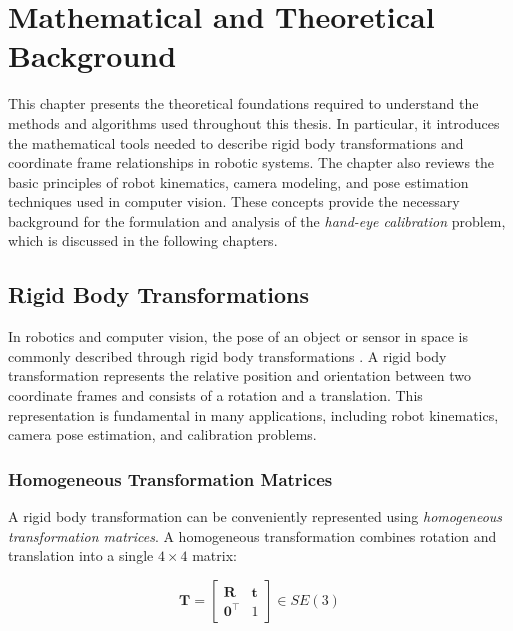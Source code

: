 \chapter{Mathematical and Theoretical Background}
\label{sec:mathematical_and_theoretical_background}

This chapter presents the theoretical foundations required to understand the
methods and algorithms used throughout this thesis. In particular, it introduces
the mathematical tools needed to describe rigid body transformations and coordinate
frame relationships in robotic systems. The chapter also reviews the basic
principles of robot kinematics, camera modeling, and pose estimation techniques
used in computer vision. These concepts provide the necessary background for the
formulation and analysis of the \textit{hand-eye calibration} problem, which is
discussed in the following chapters.

\section{Rigid Body Transformations}
\label{sec:rigid_body}

In robotics and computer vision, the pose of an object or sensor in space is
commonly described through rigid body transformations \cite{craig2005introduction,
siciliano2009robotics}. A rigid body transformation represents the relative
position and orientation between two coordinate frames and consists of a rotation
and a translation. This representation is fundamental in many applications,
including robot kinematics, camera pose estimation, and calibration problems.


\subsection{Homogeneous Transformation Matrices}
\label{subsec:homogeneous}

A rigid body transformation can be conveniently represented using
\textit{homogeneous transformation matrices}. A homogeneous transformation
combines rotation and translation into a single $4\times 4$ matrix:

\begin{equation}
    \mathbf{T} =
    \begin{bmatrix}
        \mathbf{R} & \mathbf{t} \\
        \mathbf{0}^{\top} & 1
    \end{bmatrix}
    \in SE(3)
    \label{eq:homogeneous_transform}
\end{equation}

